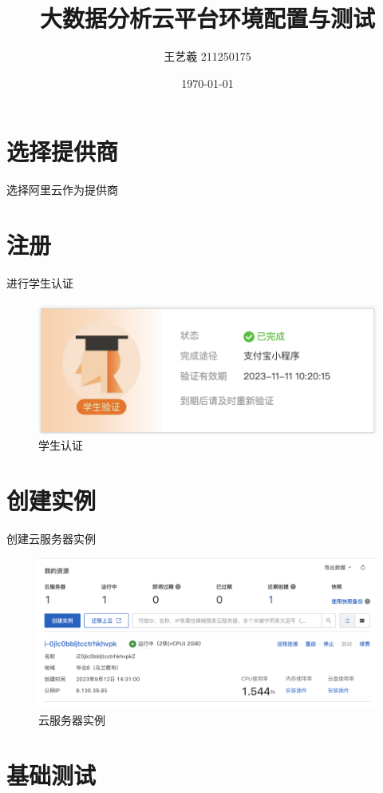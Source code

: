 \documentclass{article}
\title{大数据分析云平台环境配置与测试}
\author{王艺羲 211250175}
\date{\today}
\begin{document}
\maketitle

\section{选择提供商}
选择阿里云作为提供商
\section{注册}
进行学生认证
\begin{figure}[ht]
    \centering
    \includegraphics[width=\textwidth]{img/student.png}
    \caption{学生认证}
    \label{fig:enter-label}
\end{figure}

\section{创建实例}
创建云服务器实例
\begin{figure}[ht]
    \centering
    \includegraphics[width=\textwidth]{img/item.png}
    \caption{云服务器实例}
    \label{fig:enter-label}
\end{figure}

\section{基础测试}
\end{document}
